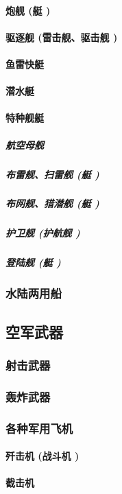 \documentclass[UTF8]{../ApplicationUniverse}
\begin{document}
            \paragraph{炮舰 (艇 )}
            \paragraph{驱逐舰 (雷击舰、驱击舰 )}
            \paragraph{鱼雷快艇}
            \paragraph{潜水艇}
            \paragraph{特种舰艇}
                \subparagraph{航空母舰}
                \subparagraph{布雷舰、扫雷舰 (艇 )}
                \subparagraph{布网舰、猎潜舰 (艇 )}
                \subparagraph{护卫舰 (护航舰 )}
                \subparagraph{登陆舰 (艇 )}
        \subsubsection{水陆两用船}

    \subsection{空军武器}
        \subsubsection{射击武器}
        \subsubsection{轰炸武器}
        \subsubsection{各种军用飞机}
            \paragraph{歼击机 (战斗机 )}
            \paragraph{截击机}
\end{document}
